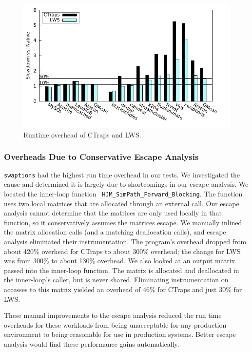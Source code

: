 \documentclass[10pt,nocopyrightspace]{sigplanconf}
\newcommand{\ctraps}{CTraps\xspace}
\newcommand{\lws}{LWS\xspace}
\newcommand{\Caption}[1]{\begin{minipage}{.95\columnwidth} \caption{#1} \end{minipage} \vspace{-1.2ex}}
\begin{document}
\begin{figure}
\centering
\includegraphics[width=.9\columnwidth]{plots/perf.pdf}
\Caption{\label{fig:perfall}Runtime overhead of \ctraps and \lws.}
\end{figure}

\subsubsection{Overheads Due to Conservative Escape Analysis}
\label{sec:eval:conservative}
{\tt swaptions} had the highest run time overhead in our tests.  We
investigated the cause and determined it is largely due to shortcomings in our
escape analysis.  We located the inner-loop function {\tt
HJM\_SimPath\_Forward\_Blocking}.  The function uses two local matrices that
are allocated through an external call.  Our escape analysis cannot determine
that the matrices are only used locally in that function, so it conservatively
assumes the matrices escape.  We manually inlined the matrix allocation calls
(and a matching deallocation calls), and escape analysis eliminated their
instrumentation.  The program's overhead dropped from about 420\% overhead for
\ctraps to about 300\% overhead; the change for \lws was from
300\% to about 130\% overhead.  We also looked at an output matrix passed into
the inner-loop function.  The matrix is allocated and deallocated in the
inner-loop's caller, but is never shared.  Eliminating instrumentation on
accesses to this matrix yielded an overhead of 46\% for \ctraps and 
just 30\% for \lws.  

These manual improvements to the escape analysis reduced the run time overheads
for these workloads from being unacceptable for any production environment to
being reasonable for use in production systems. Better escape analysis would
find these performance gains automatically.
\end{document}
